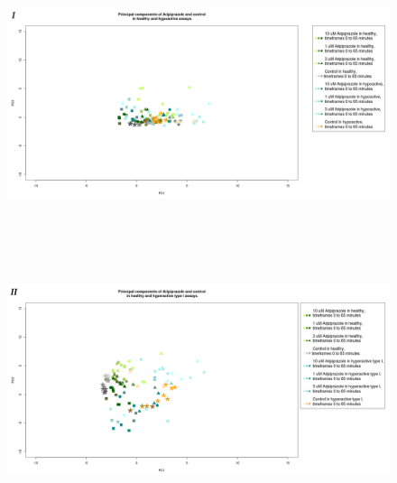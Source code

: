 \documentclass[a4paper,12pt]{article}
\begin{document}
\begin{figure}[h!]
\begin{center}
\includegraphics[width=16cm,height=8cm]{Aripiprazole_Control_DarkApoLow_turn_only.png}
\includegraphics[width=16cm,height=8cm]{Aripiprazole_Control_DarkApoHigh_turn_only.png}
\end{center}
\end{figure}
\newpage
\end{document}
